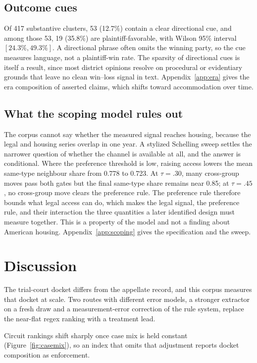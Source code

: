 \documentclass[11pt]{article}
\begin{document}
\subsection{Outcome cues}

Of 417 substantive clusters, 53 (12.7\%) contain a clear directional cue, and among those 53, 19 (35.8\%) are plaintiff-favorable, with Wilson 95\% interval $[24.3\%, 49.3\%]$. A directional phrase often omits the winning party, so the cue measures language, not a plaintiff-win rate. The sparsity of directional cues is itself a result, since most district opinions resolve on procedural or evidentiary grounds that leave no clean win--loss signal in text. Appendix~\ref{app:era} gives the era composition of asserted claims, which shifts toward accommodation over time.

\subsection{What the scoping model rules out}

The corpus cannot say whether the measured signal reaches housing, because the legal and housing series overlap in one year. A stylized Schelling sweep settles the narrower question of whether the channel is available at all, and the answer is conditional. Where the preference threshold is low, raising access lowers the mean same-type neighbour share from 0.778 to 0.723. At $\tau=.30$, many cross-group moves pass both gates but the final same-type share remains near 0.85; at $\tau=.45$, no cross-group move clears the preference rule. The preference rule therefore bounds what legal access can do, which makes the legal signal, the preference rule, and their interaction the three quantities a later identified design must measure together. This is a property of the model and not a finding about American housing. Appendix~\ref{app:scoping} gives the specification and the sweep.

\section{Discussion}

The trial-court docket differs from the appellate record, and this corpus measures that docket at scale. Two routes with different error models, a stronger extractor on a fresh draw and a measurement-error correction of the rule system, replace the near-flat regex ranking with a treatment lead.

Circuit rankings shift sharply once case mix is held constant (Figure~\ref{fig:casemix}), so an index that omits that adjustment reports docket composition as enforcement.
\end{document}
